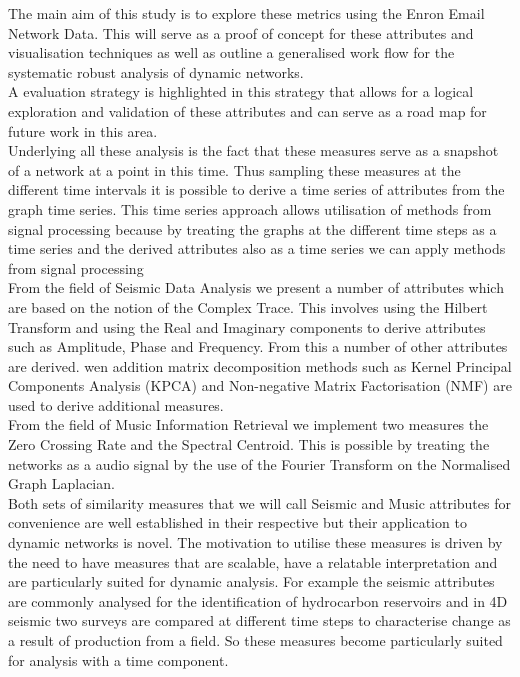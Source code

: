 The main aim of this study is to explore these metrics using the Enron Email Network Data. This will serve as a proof of concept for these attributes and visualisation techniques as well as outline a generalised work flow for the systematic robust analysis of dynamic networks. \\

A evaluation strategy is highlighted in this strategy that allows for a logical exploration and validation of these attributes and can serve as a road map for future work in this area.  \\

Underlying all these analysis is the fact that these measures serve as a snapshot of a network at a point in this time. Thus sampling these measures at the different time intervals it is possible to derive a time series of attributes from the graph time series. This time series approach allows utilisation of methods from signal processing because by treating the graphs at the different time steps as a time series and the derived attributes also as a time series we can apply methods from signal processing \\

From the field of Seismic Data Analysis we present a number of attributes which are based on the notion of the Complex Trace. This involves using the Hilbert Transform and using the Real and Imaginary components to derive attributes such as Amplitude, Phase and Frequency. From this a number of other attributes are derived. wen addition matrix decomposition methods such as Kernel Principal Components Analysis (KPCA) and Non-negative Matrix Factorisation (NMF) are used to derive additional measures. \\

From the field of Music Information Retrieval we implement two measures the Zero Crossing Rate and the Spectral Centroid. This is possible by treating the networks as a audio signal by the use of the Fourier Transform on the Normalised Graph Laplacian. \\

Both sets of similarity measures that we will call Seismic and Music attributes for convenience are well established in their respective but their application to dynamic networks is novel. The motivation to utilise these measures is driven by the need to have measures that are scalable, have a relatable interpretation and are particularly suited for dynamic analysis. For example the seismic attributes are commonly analysed for the identification of hydrocarbon reservoirs and in 4D seismic two surveys are compared at different time steps to characterise change as a result of production from a field. So these measures become particularly suited for analysis with a time component. \\

